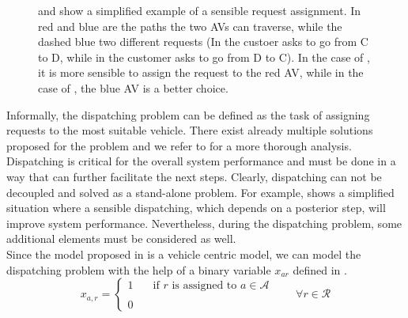 \begin{figure}
\begin{subfigure}{0.5\linewidth}
		\caption{}
		\label{fig:req_notassignable}
	\end{subfigure}
	\caption[Example of a Sensible Request assignment]{ and  show a simplified example of a sensible request assignment. In red and blue are the paths the two AVs can traverse, while the dashed blue two different requests (In  the custoer asks to go from C to D, while in  the customer asks to go from D to C). In the case of , it is more sensible to assign the request to the red AV, while in the case of , the blue AV is a better choice. }
	\label{fig:sens_assignment}
\end{figure}

Informally, the dispatching problem can be defined as the task of assigning requests to the most suitable vehicle. There exist already multiple solutions proposed for the problem and we refer to  for a more thorough analysis. \\
Dispatching is critical for the overall system performance and must be done in a way that can further facilitate the next steps. Clearly, dispatching can not be decoupled and solved as a stand-alone problem. For example,  shows a simplified situation where a sensible dispatching, which depends on a posterior step, will improve system performance. Nevertheless, during the dispatching problem, some additional elements must be considered as well. \\
Since the model proposed in  is a vehicle centric model, we can model the dispatching problem with the help of a binary variable $x_{ar}$ defined in . 
\begin{equation*}
	x_{a,r} = 
	\begin{cases} 
		1 & \quad \text{if $r$ is assigned to } a \in \mathcal{A}\\
		\\
		0
	\end{cases}
	\quad\quad \forall r \in \mathcal{R}
	\label{eq:dispatching_var}
\end{equation*}

